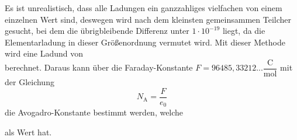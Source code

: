 Es ist unrealistisch, dass alle Ladungen ein ganzzahliges vielfachen von einem einzelnen Wert sind, deswegen wird nach dem kleinsten gemeinsammen Teilcher gesucht, bei dem die übrigbleibende Differenz unter $1 \cdot 10^{-19}$ liegt, da die Elementarladung in dieser Größenordnung vermutet wird.
Mit dieser Methode wird eine Ladund von 
\begin{equation}
  \label{eq:egemessen}
\end{equation}
berechnet.
Daraus kann über die Faraday-Konstante $ F = 96485,33212... \dfrac{\unit{\coulomb}}{\text{mol}}$ \cite{go02} mit der Gleichung 
\begin{equation*}
  N_\text{A} = \dfrac{F}{e_0}
  \label{eq:egemessen}
\end{equation*}
die Avogadro-Konstante bestimmt werden, welche 

\begin{equation*}
  \label{eq:egemessen}
\end{equation*}
als Wert hat.
